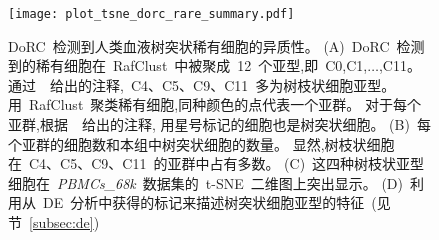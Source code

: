\begin{figure}[!htbp]
    \centering
    \texttt{[image: plot\_tsne\_dorc\_rare\_summary.pdf]}
    \caption{
    DoRC~检测到人类血液树突状稀有细胞的异质性。
    (A)~DoRC~检测到的稀有细胞在~RafClust~中被聚成~12~个亚型,即~C0,C1,$\ldots$,C11。
    通过~\cite{zheng2017massively}~给出的注释,~C4、C5、C9、C11~多为树枝状细胞亚型。
    用~RafClust~聚类稀有细胞,同种颜色的点代表一个亚群。
    对于每个亚群,根据~\cite{zheng2017massively}~给出的注释,
    用星号标记的细胞也是树突状细胞。
    (B)~每个亚群的细胞数和本组中树突状细胞的数量。
    显然,树枝状细胞在~C4、C5、C9、C11~的亚群中占有多数。
    (C)~这四种树枝状亚型细胞在~\textit{PBMCs\_68k}~数据集的~t-SNE~二维图上突出显示。
    (D)~利用从~DE~分析中获得的标记来描述树突状细胞亚型的特征~(见节~\ref{subsec:de})
    }
    \label{fig:dorc_dendritic}
\end{figure}

